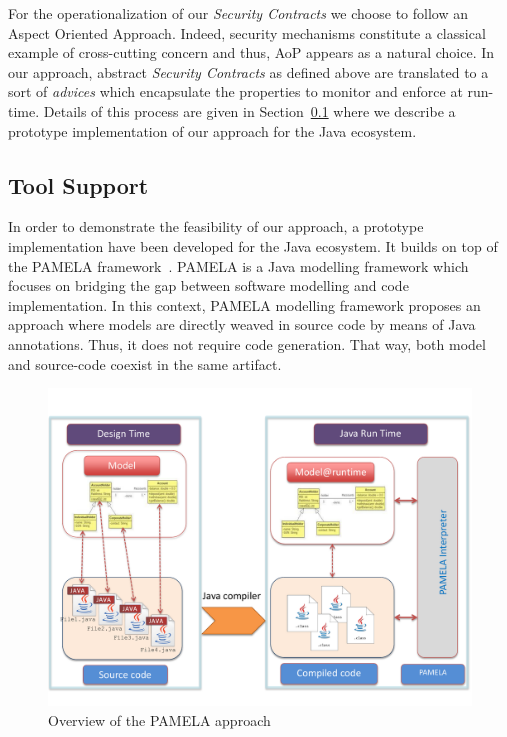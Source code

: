 For the operationalization of our \emph{Security Contracts} we choose to follow an Aspect Oriented Approach. Indeed, security mechanisms constitute a classical example of cross-cutting concern and thus, AoP appears as a natural choice. In our approach, abstract \emph{Security Contracts} as defined above are translated to a sort of \emph{advices} which encapsulate the properties to monitor and enforce at run-time. Details of this process are given in Section~\ref{subsec:toolsupport} where we describe a prototype implementation of our approach for the Java ecosystem.


\subsection{Tool Support}
\label{subsec:toolsupport}

In order to demonstrate the feasibility of our approach, a prototype implementation have been developed for the Java ecosystem. It builds on top of the PAMELA framework~\cite{guerin:hal-03217126}. PAMELA is a Java modelling framework which focuses on bridging the gap between software modelling and code implementation. In this context, PAMELA modelling framework proposes an approach where models are directly weaved in source code by means of Java annotations. Thus, it does not require code generation. That way, both model and source-code coexist in the same artifact.

\begin{figure}
    \centering
    \includegraphics[width=1.0 \columnwidth]{figures/PamelaVisionV2.pdf}
    \caption{Overview of the PAMELA approach}
    \label{fig:PamelaVision}
\end{figure}

